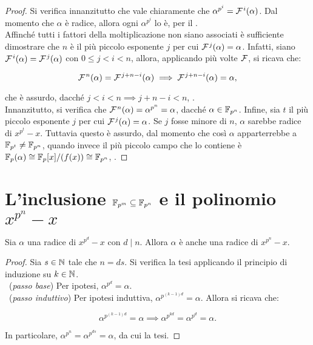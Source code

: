 \documentclass[11pt]{scrbook}
\begin{document}
\begin{proof}
    Si verifica innanzitutto che vale chiaramente che $\alpha^{p^i} = \mathcal{F}{\mkern 1.5mu}^i(\alpha)$.
    Dal momento che $\alpha$ è radice, allora ogni $\alpha^{p^i}$ lo è, per il
    . \\

    Affinché tutti i fattori della moltiplicazione non siano associati è sufficiente
    dimostrare che $n$ è il più piccolo esponente $j$ per cui $\mathcal{F}{\mkern 1.5mu}^j(\alpha)=\alpha$.
    Infatti, siano $\mathcal{F}{\mkern 1.5mu}^i(\alpha)=\mathcal{F}{\mkern 1.5mu}^j(\alpha)$ con $0\leq j < i < n$, allora,
    applicando più volte $\mathcal{F}$, si ricava che:

    \[ \mathcal{F}{\mkern 1.5mu}^n(\alpha)=\mathcal{F}{\mkern 1.5mu}^{j+n-i}(\alpha) \implies \mathcal{F}{\mkern 1.5mu}^{j+n-i}(\alpha)=
        \alpha, \]

    \vskip 0.1in

    che è assurdo, dacché $j < i < n \implies j+n-i < n$, \Lightning{}. \\

    Innanzitutto, si verifica che $\mathcal{F}{\mkern 1.5mu}^{n}(\alpha)=\alpha^{p^n}=\alpha$, dacché
    $\alpha \in \mathbb{F}_{p^n}$. Infine, sia $t$ il più piccolo esponente $j$ per cui
    $\mathcal{F}{\mkern 1.5mu}^j(\alpha)=\alpha$. Se $j$ fosse minore di $n$, $\alpha$ sarebbe
    radice di $x^{p^t}-x$. Tuttavia questo è assurdo, dal momento che così
    $\alpha$ apparterrebbe a $\mathbb{F}_{p^{t}} \neq \mathbb{F}_{p^n}$, quando invece il più
    piccolo campo che lo contiene è $\mathbb{F}_p(\alpha) \cong \mathbb{F}_p[x]/(f(x)) \cong \mathbb{F}_{p^n}$,
    \Lightning{}.
\end{proof}

\section{L'inclusione \texorpdfstring{$\mathbb{F}_{p^m} \subseteq \mathbb{F}_{p^n}$}{F\_(p\string^m) in F\_(p\string^n)} e il polinomio \texorpdfstring{$x^{p^n}-x$}{x\string^(p\string^n)-x}}

\begin{lemma}
    \label{lem:alpha_radice}
    Sia $\alpha$ una radice di $x^{p^d}-x$ con $d \mid n$. Allora
    $\alpha$ è anche una radice di $x^{p^n}-x$.
\end{lemma}

\begin{proof} Sia $s \in \mathbb N$ tale che $n=ds$.
    Si verifica la tesi applicando il principio di induzione su $k \in \mathbb N$. \\

    \ (\textit{passo base})\; Per ipotesi, $\alpha^{p^d}=\alpha$. \\

    \ (\textit{passo induttivo})\; Per ipotesi induttiva, $\alpha^{p^{(k-1)d}}=\alpha$. Allora si ricava che:

    \[ \alpha^{p^{(k-1)d}}=\alpha \implies \alpha^{p^{kd}}=\alpha^{p^d}=\alpha. \]

    \vskip 0.1in

    In particolare, $\alpha^{p^n} = \alpha^{p^{ds}} = \alpha$, da cui la tesi.

\end{proof}
\end{document}
